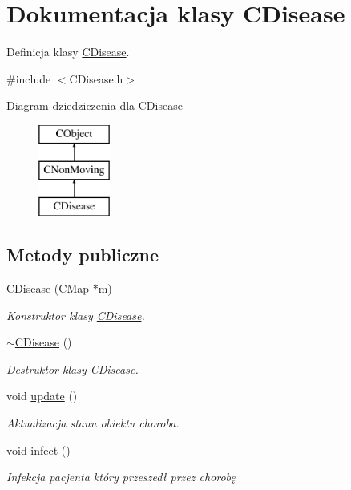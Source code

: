 \hypertarget{class_c_disease}{}\section{Dokumentacja klasy C\+Disease}
\label{class_c_disease}


Definicja klasy \mbox{\hyperlink{class_c_disease}{C\+Disease}}.  




{\ttfamily \#include $<$C\+Disease.\+h$>$}

Diagram dziedziczenia dla C\+Disease\begin{figure}[H]
\begin{center}
\leavevmode
\includegraphics[height=3.000000cm]{class_c_disease}
\end{center}
\end{figure}
\subsection*{Metody publiczne}
\begin{DoxyCompactItemize}
\item 
\mbox{\hyperlink{class_c_disease_a28bd723c5f215b32e1394f8e1c38bfb3}{C\+Disease}} (\mbox{\hyperlink{class_c_map}{C\+Map}} $\ast$m)
\begin{DoxyCompactList}\small\item\em Konstruktor klasy \mbox{\hyperlink{class_c_disease}{C\+Disease}}. \end{DoxyCompactList}\item 
\mbox{\hyperlink{class_c_disease_a8f75741e14b8ddc657bd49df3751cb99}{$\sim$\+C\+Disease}} ()
\begin{DoxyCompactList}\small\item\em Destruktor klasy \mbox{\hyperlink{class_c_disease}{C\+Disease}}. \end{DoxyCompactList}\item 
void \mbox{\hyperlink{class_c_disease_a2f8e7ad1e743ace0540a09a6f620d6d7}{update}} ()
\begin{DoxyCompactList}\small\item\em Aktualizacja stanu obiektu choroba. \end{DoxyCompactList}\item 
void \mbox{\hyperlink{class_c_disease_ad0183fc219d8292b6e398a46ea700b2c}{infect}} ()
\begin{DoxyCompactList}\small\item\em Infekcja pacjenta który przeszedł przez chorobę \end{DoxyCompactList}\end{DoxyCompactItemize}
